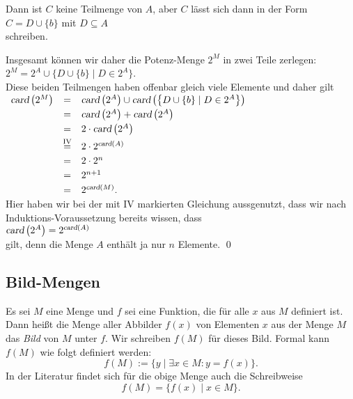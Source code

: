 \begin{enumerate}
\begin{enumerate}
           Dann ist $C$ keine Teilmenge von $A$, aber $C$ l\"{a}sst sich dann in der Form 
           \\[0.2cm]
           \hspace*{1.3cm}
           $C = D \cup \{ b \}$  \quad mit $D \subseteq A$
           \\[0.2cm]
           schreiben.
     \end{enumerate}
     Insgesamt k\"{o}nnen wir daher die Potenz-Menge $2^M$ in zwei Teile zerlegen:
     \\[0.2cm]
     \hspace*{1.3cm}
     $2^M = 2^A \cup \bigl\{ D \cup \{ b \} \mid D \in 2^A \bigr\}$.
     \\[0.2cm]
     Diese beiden Teilmengen haben offenbar gleich viele Elemente und daher gilt
     \\[0.2cm]
     \hspace*{1.3cm}
     $
     \begin{array}[b]{lcl}
          \textsl{card}\left(2^M\right) & = &
          \textsl{card}\left(2^A\right) \cup \textsl{card}\left(\bigl\{ D \cup \{ b \} \mid D \in 2^A \bigr\}\right) \\[0.1cm]
     & = & \textsl{card}\left(2^A\right) + \textsl{card}\left(2^A\right) \\[0.1cm]
     & = & 2 \cdot \textsl{card}\left(2^A\right) \\[0.1cm]
     & \stackrel{\mbox{\scriptsize IV}}{=} & 2 \cdot 2^{\textsl{card}(A)} \\[0.1cm]
     & = & 2 \cdot 2^{n} \\[0.1cm]
     & = & 2^{n+1} \\[0.1cm]
     & = & 2^{\textsl{card}(M)}.  
     \end{array}
     $ 
      \\[0.2cm]
      Hier haben wir bei der mit IV markierten Gleichung aussgenutzt, dass wir nach
      Induktions-Voraussetzung bereits wissen, dass 
      \\[0.2cm]
      \hspace*{1.3cm}
      $\textsl{card}\left(2^A\right) = 2^{\textsl{card}(A)}$
      \\[0.2cm]
      gilt, denn die Menge $A$ enth\"{a}lt ja nur $n$ Elemente.  \qed
\end{enumerate}


\subsection{Bild-Mengen}
Es sei $M$ eine Menge und $f$ sei eine Funktion, die f\"{u}r alle $x$ aus $M$ definiert ist.
Dann heißt die Menge aller Abbilder $f(x)$ von Elementen $x$ aus der Menge $M$ das
\emph{Bild} von $M$ unter $f$.  Wir schreiben $f(M)$ f\"{u}r dieses Bild.
Formal kann $f(M)$ wie folgt definiert werden: 
 \[ f(M) := \{ y \;|\; \exists x \in M: y = f(x) \}. \]
In der Literatur findet sich f\"{u}r die obige Menge auch die Schreibweise
\[ f(M) = \bigl\{ f(x) \;|\; x \in M \}. \]

